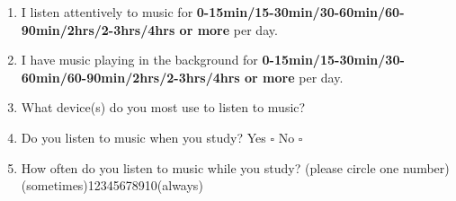 \documentclass[12pt, a4paper]{article}
\begin{document}
\begin{enumerate}
\item I listen attentively to music for \textbf{0-15min\hspace{2pt}/\hspace{2pt}15-30min\hspace{2pt}/\hspace{2pt}30-60min\hspace{2pt}/\hspace{2pt}60-90min\hspace{2pt}/\hspace{2pt}2hrs\hspace{2pt}/\hspace{2pt}2-3hrs\hspace{2pt}/\hspace{2pt}4hrs or more} per day.
\item I have music playing in the background for \textbf{0-15min\hspace{2pt}/\hspace{2pt}15-30min\hspace{2pt}/\hspace{2pt}30-60min\hspace{2pt}/\hspace{2pt}60-90min\hspace{2pt}/\hspace{2pt}2hrs\hspace{2pt}/\hspace{2pt}2-3hrs\hspace{2pt}/\hspace{2pt}4hrs or more} per day.
\item What device(s) do you most use to listen to music? \hrulefill
\item Do you listen to music when you study?  \hspace{12pt} Yes $\square$ No $\square$
\item How often do you listen to music while you study? (please circle one number)
\newline (sometimes)\hspace{12pt}1\hspace{12pt}2\hspace{12pt}3\hspace{12pt}4\hspace{12pt}5\hspace{12pt}6\hspace{12pt}7\hspace{12pt}8\hspace{12pt}9\hspace{12pt}10\hspace{12pt}(always) 

\end{enumerate}
\end{document}

